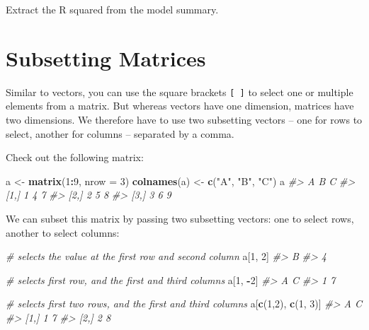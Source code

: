 \documentclass[]{book}
\newenvironment{Shaded}{\begin{snugshade}}{\end{snugshade}}
\newcommand{\KeywordTok}[1]{\textcolor[rgb]{0.13,0.29,0.53}{\textbf{#1}}}
\newcommand{\DataTypeTok}[1]{\textcolor[rgb]{0.13,0.29,0.53}{#1}}
\newcommand{\DecValTok}[1]{\textcolor[rgb]{0.00,0.00,0.81}{#1}}
\newcommand{\StringTok}[1]{\textcolor[rgb]{0.31,0.60,0.02}{#1}}
\newcommand{\CommentTok}[1]{\textcolor[rgb]{0.56,0.35,0.01}{\textit{#1}}}
\newcommand{\OperatorTok}[1]{\textcolor[rgb]{0.81,0.36,0.00}{\textbf{#1}}}
\newcommand{\NormalTok}[1]{#1}
\begin{document}
Extract the R squared from the model summary.

\section{Subsetting Matrices}\label{subsetting-matrices}

Similar to vectors, you can use the square brackets \texttt{{[}\ {]}} to
select one or multiple elements from a matrix. But whereas vectors have
one dimension, matrices have two dimensions. We therefore have to use
two subsetting vectors -- one for rows to select, another for columns --
separated by a comma.

Check out the following matrix:

\begin{Shaded}
\begin{Highlighting}[]
\NormalTok{a <-}\StringTok{ }\KeywordTok{matrix}\NormalTok{(}\DecValTok{1}\OperatorTok{:}\DecValTok{9}\NormalTok{, }\DataTypeTok{nrow =} \DecValTok{3}\NormalTok{)}
\KeywordTok{colnames}\NormalTok{(a) <-}\StringTok{ }\KeywordTok{c}\NormalTok{(}\StringTok{"A"}\NormalTok{, }\StringTok{"B"}\NormalTok{, }\StringTok{"C"}\NormalTok{)}
\NormalTok{a}
\CommentTok{#>      A B C}
\CommentTok{#> [1,] 1 4 7}
\CommentTok{#> [2,] 2 5 8}
\CommentTok{#> [3,] 3 6 9}
\end{Highlighting}
\end{Shaded}

We can subset this matrix by passing two subsetting vectors: one to
select rows, another to select columns:

\begin{Shaded}
\begin{Highlighting}[]
\CommentTok{# selects the value at the first row and second column}
\NormalTok{a[}\DecValTok{1}\NormalTok{, }\DecValTok{2}\NormalTok{] }
\CommentTok{#> B }
\CommentTok{#> 4}

\CommentTok{# selects first row, and the first and third columns}
\NormalTok{a[}\DecValTok{1}\NormalTok{, }\OperatorTok{-}\DecValTok{2}\NormalTok{] }
\CommentTok{#> A C }
\CommentTok{#> 1 7}

\CommentTok{# selects first two rows, and the first and third columns}
\NormalTok{a[}\KeywordTok{c}\NormalTok{(}\DecValTok{1}\NormalTok{,}\DecValTok{2}\NormalTok{), }\KeywordTok{c}\NormalTok{(}\DecValTok{1}\NormalTok{, }\DecValTok{3}\NormalTok{)] }
\CommentTok{#>      A C}
\CommentTok{#> [1,] 1 7}
\CommentTok{#> [2,] 2 8}
\end{Highlighting}
\end{Shaded}
\end{document}
